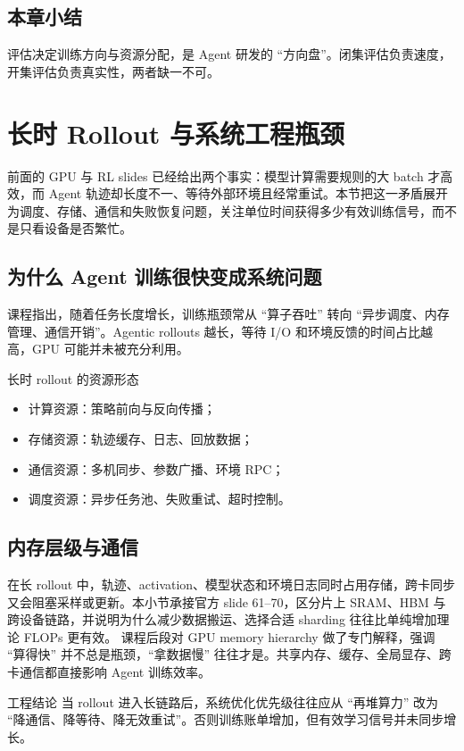 \documentclass[a4paper]{article}
\begin{document}
\subsection{本章小结}
评估决定训练方向与资源分配，是 Agent 研发的 ``方向盘''。闭集评估负责速度，开集评估负责真实性，两者缺一不可。


\section{长时 Rollout 与系统工程瓶颈}

前面的 GPU 与 RL slides 已经给出两个事实：模型计算需要规则的大 batch 才高效，而 Agent 轨迹却长度不一、等待外部环境且经常重试。本节把这一矛盾展开为调度、存储、通信和失败恢复问题，关注单位时间获得多少有效训练信号，而不是只看设备是否繁忙。

\subsection{为什么 Agent 训练很快变成系统问题}
课程指出，随着任务长度增长，训练瓶颈常从 ``算子吞吐'' 转向 ``异步调度、内存管理、通信开销''。Agentic rollouts 越长，等待 I/O 和环境反馈的时间占比越高，GPU 可能并未被充分利用。

\begin{knowledgebox}{长时 rollout 的资源形态}
\begin{itemize}
    \item 计算资源：策略前向与反向传播；
    \item 存储资源：轨迹缓存、日志、回放数据；
    \item 通信资源：多机同步、参数广播、环境 RPC；
    \item 调度资源：异步任务池、失败重试、超时控制。
\end{itemize}
\end{knowledgebox}

\subsection{内存层级与通信}
在长 rollout 中，轨迹、activation、模型状态和环境日志同时占用存储，跨卡同步又会阻塞采样或更新。本小节承接官方 slide 61--70，区分片上 SRAM、HBM 与跨设备链路，并说明为什么减少数据搬运、选择合适 sharding 往往比单纯增加理论 FLOPs 更有效。
课程后段对 GPU memory hierarchy 做了专门解释，强调 ``算得快'' 并不总是瓶颈，``拿数据慢'' 往往才是。共享内存、缓存、全局显存、跨卡通信都直接影响 Agent 训练效率。

\begin{importantbox}{工程结论}
当 rollout 进入长链路后，系统优化优先级往往应从 ``再堆算力'' 改为 ``降通信、降等待、降无效重试''。否则训练账单增加，但有效学习信号并未同步增长。
\end{importantbox}
\end{document}
